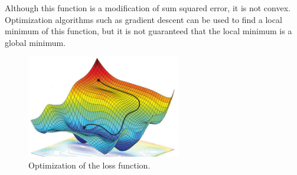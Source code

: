 Although this function is a modification of sum squared error, it is not convex. Optimization algorithms such as gradient descent can be used to find a local minimum of this function, but it is not guaranteed that the local minimum is a global minimum.

\begin{figure}[htbp]
\centering
\includegraphics[width=0.6\textwidth]{images/nnopt}
\caption{Optimization of the loss function.}
\end{figure}